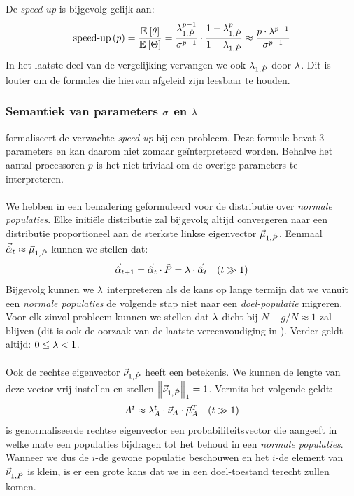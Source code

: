 De \emph{speed-up} is bijgevolg gelijk aan:
\begin{equation}
\funm{speed-up}{p}=\displaystyle\frac{\mean{\hittime}}{\mean{\phittime}}=\displaystyle\frac{\ev[1,\removmat]^{p-1}}{\metapa^{p-1}}\cdot\displaystyle\frac{1-\ev[1,\removmat]^{p}}{1-\ev[1,\removmat]}\approx\displaystyle\frac{p\cdot\metapb^{p-1}}{\metapa^{p-1}}
\eqnlab{speedupMetaheuristic}
\end{equation}
In het laatste deel van de vergelijking vervangen we ook $\ev[1,\removmat]$ door $\metapb$. Dit is louter om de formules die hiervan afgeleid zijn leesbaar te houden.

\subsubsection{Semantiek van parameters $\metapa$ en $\metapb$}

 formaliseert de verwachte \emph{speed-up} bij een probleem. Deze formule bevat 3 parameters en kan daarom niet zomaar ge\"interpreteerd worden. Behalve het aantal processoren $p$ is het niet triviaal om de overige parameters te interpreteren.

\paragraph{}
We hebben in  een benadering geformuleerd voor de distributie over \emph{normale populaties}. Elke initi\"ele distributie zal bijgevolg altijd convergeren naar een distributie proportioneel aan de sterkste linkse eigenvector $\evl[1,\removmat]$. Eenmaal $\probdistnormmeta{t}\approx\evl[1,\removmat]$ kunnen we stellen dat:
\begin{equation}
\conditional{\probdistnormmeta{t+1}=\probdistnormmeta{t}\cdot\removmat=\metapb\cdot\probdistnormmeta{t}}{$t\gg 1$}
\end{equation}
Bijgevolg kunnen we $\metapb$ interpreteren als de kans op lange termijn dat we vanuit een \emph{normale populaties} de volgende stap niet naar een \emph{doel-populatie} migreren. Voor elk zinvol probleem kunnen we stellen dat $\metapb$ dicht bij $N-g/N\approx 1$ zal blijven (dit is ook de oorzaak van de laatste vereenvoudiging in ). Verder geldt altijd: $0\leq\metapb<1$.

\paragraph{}
Ook de rechtse eigenvector $\evr[1,\removmat]$ heeft een betekenis. We kunnen de lengte van deze vector vrij instellen en stellen $\dabs[1]{\evr[1,\removmat]}=1$. Vermits het volgende geldt:
\begin{equation}
\conditional{A^t\approx\ev[A]^t\cdot\evr[A]\cdot\evl[A]^T}{$t\gg1$}
\end{equation}
is genormaliseerde rechtse eigenvector een probabiliteitsvector die aangeeft in welke mate een populaties bijdragen tot het behoud in een \emph{normale populaties}. Wanneer we dus de $i$-de gewone populatie beschouwen en het $i$-de element van $\evr[1,\removmat]$ is klein, is er een grote kans dat we in een doel-toestand terecht zullen komen.

